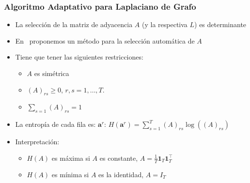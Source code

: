 \documentclass[aspectratio=43,spanish]{beamer}
\newcommand{\norm}[1]{\left\lVert#1\right\rVert}
\newcommand{\opt}[1]{{#1}^*}
\newcommand{\myvec}[1]{\bm{#1}}
\newcommand{\fv}[1]{\myvec{#1}}
\newcommand{\ntasks}{T}
\begin{document}
\begin{frame}
      \frametitle{Algoritmo Adaptativo para Laplaciano de Grafo}

      \begin{itemize}
            \item La selección de la matriz de adyacencia $A$ (y la respectiva $L$) es determinante
            \item En~ proponemos un método para la selección automática de $A$
            \item Tiene que tener las siguientes restricciones:
            \begin{itemize}
                  \item $A$ es simétrica
                  \item $(A)_{rs} \geq 0$, $r, s=1, \ldots, \ntasks$.
                  \item $\sum_{s=1} (A)_{rs} = 1$
              \end{itemize}
            \item La entropía de cada fila es: $\fv{a}^r$: $H(\fv{a}^r) = \sum_{s=1}^\ntasks (A)_{rs} \log((A)_{rs})$
            \item Interpretación:
            \begin{itemize}
                  \item $H(A)$ es máxima si $A$ es constante, $A = \frac{1}{\ntasks} \fv{1}_\ntasks \fv{1}_\ntasks^\intercal$
                  \item $H(A)$ es mínima si $A$ es la identidad, $A = I_\ntasks$ 
            \end{itemize}
            
      \end{itemize}

\end{frame}
\end{document}
